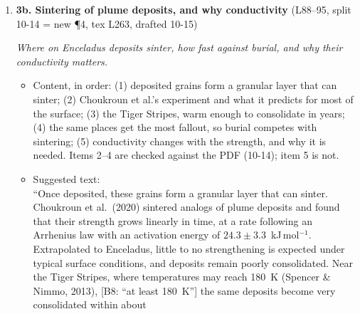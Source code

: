 \documentclass[11pt]{article}
\newcommand{\Pg}[3]{\item \textbf{#1} {\small(#2)}\par\textit{#3}}
\newcommand{\tC}{\textcolor{miss}{\textbf{[correct]}}\ }
\newcommand{\tG}{\textcolor{stale}{\textbf{[wording]}}\ }
\newcommand{\add}[1]{\textcolor{revB}{#1}}
\newcommand{\del}[1]{\textcolor{red}{[del: #1]}}
\begin{document}
\begin{enumerate}
\begin{itemize}
    back onto the surface. At Enceladus this was observed directly by
    \textit{Cassini}, which detected numerous jets converging into a plume
    from four fractures near the south pole, known as the Tiger Stripes
    (Spitale \& Porco, 2007). The plume's grains are micron-sized, mostly
    water ice, and \del{contain percent-level NaCl} \add{some carry percent-level sodium salts, mainly NaCl} (Postberg et al., 2009) and
    complex organic material (Postberg et al., 2018).''
  \item \add{\tC Percent-level salt is in about 6\% of the sampled E-ring grains; over 90\% carry only trace Na (Postberg et al.\
    2009, p.1). Likewise organics: about 25\% of spectra, macromolecules in a subgroup (Postberg et al.\ 2018, p.1). ``some
    grains''. Adopted otherwise (tex L260).}
  \item \tG Italicize \textit{Cassini} at every mention in the text.
  \end{itemize}
\Pg{3b. Sintering of plume deposits, and why conductivity}{L88--95, split 10-14 \add{= new \P4, tex L263, drafted 10-15}}{Where on Enceladus deposits sinter, how fast against burial, and why their conductivity matters.}
  \begin{itemize}
  \item Content, in order: (1) deposited grains form a granular layer that
    can sinter; (2) Choukroun et al.'s experiment and what it predicts for
    most of the surface; (3) the Tiger Stripes, warm enough to consolidate
    in years; (4) the same places get the most fallout, so burial competes
    with sintering; (5) conductivity changes with the strength, and why it
    is needed. Items 2--4 are checked against the PDF (10-14); item 5 is
    not.
  \item Suggested text:\\
    ``Once deposited, these grains form a granular layer that can sinter.
    Choukroun et al.\ (2020) sintered analogs of plume deposits and found
    that their strength grows linearly in time, at a rate following an
    Arrhenius law with an activation energy of $24.3 \pm 3.3$~kJ\,mol$^{-1}$.
    Extrapolated to Enceladus, little to no strengthening is expected under
    typical surface conditions, and deposits remain poorly consolidated.
    Near the Tiger Stripes, where temperatures may reach 180~K (Spencer \&
    Nimmo, 2013), \add{[B8: ``at least 180~K'']} the same deposits become very consolidated within about

\end{itemize}
\end{enumerate}
\end{document}
